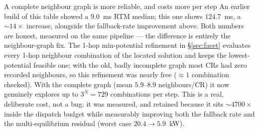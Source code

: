 \documentclass[11pt, letterpaper]{article}
\begin{document}
\begin{warnbox}{A complete neighbour graph is more reliable, and costs more per step}
An earlier build of this table showed a $9.0$~ms RTM median; this one shows $124.7$~ms, a
$\sim\!14\times$ increase, alongside the fallback-rate improvement above. Both numbers are honest,
measured on the same pipeline --- the difference is entirely the neighbour-graph fix. The 1-hop
min-potential refinement in \S\ref{sec:facet} evaluates every 1-hop neighbour combination of the
located solution and keeps the lowest-potential feasible one; with the old, badly incomplete graph
most CRs had zero recorded neighbours, so this refinement was nearly free ($\approx\!1$ combination
checked). With the complete graph (mean $5.9$--$8.9$ neighbours/CR) it now genuinely explores up to
$3^N=729$ combinations per step. This is a real, deliberate cost, not a bug: it was measured, and
retained because it sits $\sim\!4700\times$ inside the dispatch budget while measurably improving
both the fallback rate and the multi-equilibrium residual (worst case $20.4\to5.9$~kW).
\end{warnbox}
\end{document}
